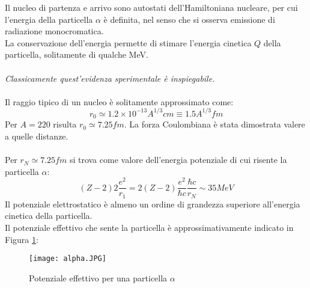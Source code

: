 \documentclass[twoside]{article}
\begin{document}
Il nucleo di partenza e arrivo sono autostati dell'Hamiltoniana nucleare, per cui l'energia della particella $\alpha$ è definita, nel senso che si osserva emissione di radiazione monocromatica.
\\
La conservazione dell'energia permette di stimare l'energia cinetica $Q$ della particella, solitamente di qualche MeV.
\\ \\
\textit{Classicamente quest'evidenza sperimentale è inspiegabile.}
\\ \\
Il raggio tipico di un nucleo è solitamente approssimato come:
\begin{equation}
    r_0\simeq1.2\times 10^{-13}A^{1/3}cm\equiv 1.5 A^{1/3}fm
\end{equation}
Per $A=220$ risulta $r_0\simeq 7.25 fm$. La forza Coulombiana è stata dimostrata valere a quelle distanze.
\\ \\
Per $r_N \simeq 7.25 fm$ si trova come valore dell'energia potenziale di cui risente la particella $\alpha$:
\begin{equation}
    (Z-2)2\frac{e^2}{r_1}=2(Z-2)\frac{e^2}{\hbar c}\frac{\hbar c}{r_N}\sim 35 MeV
\end{equation}
Il potenziale elettrostatico è almeno un ordine di grandezza superiore all'energia cinetica della particella.
\\
Il potenziale effettivo che sente la particella è approssimativamente indicato in Figura \ref{alpha}:

\begin{figure}[ht]
\centering
\texttt{[image: alpha.JPG]}
\caption{Potenziale effettivo per una particella $\alpha$}
\label{alpha}
\end{figure}
\end{document}
